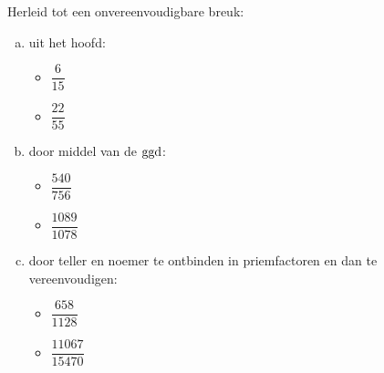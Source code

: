 \documentclass[12pt]{article}
\begin{document}
\begin{exercise}
Herleid tot een onvereenvoudigbare breuk:
\begin{enumerate}[(a)]
  \item uit het hoofd:
  \begin{itemize}
    \item $\dfrac{6}{15}$
    \item $\dfrac{22}{55}$
  \end{itemize}
  \item door middel van de $\ggd$:
  \begin{itemize}
    \item $\dfrac{540}{756}$
    \item $\dfrac{1089}{1078}$
  \end{itemize}
  \item door teller en noemer te ontbinden in priemfactoren en dan te vereenvoudigen:
  \begin{itemize}
    \item $\dfrac{658}{1128}$
    \item $\dfrac{11067}{15470}$
  \end{itemize}
\end{enumerate}
\end{exercise}
\end{document}
